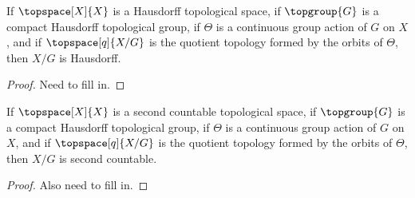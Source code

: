 \documentclass{article}                                                        %
\begin{document}
        \begin{theorem}
            \label{thm:Quotient_by_Compact_T2_Group_Preserves_T2}%
            If $\topspace[X]{X}$ is a Hausdorff topological space, if
            $\topgroup{G}$ is a compact Hausdorff topological group, if
            $\Theta$ is a continuous group action of $G$ on $X$, and if
            $\topspace[q]{X/G}$ is the quotient topology formed by the orbits
            of $\Theta$, then $X/G$ is Hausdorff.
        \end{theorem}
        \begin{proof}
            Need to fill in.
        \end{proof}
        \begin{theorem}
            \label{thm:Quotient_by_Compact_T2_Group_Preserves_Sec_Count}%
            If $\topspace[X]{X}$ is a second countable topological space, if
            $\topgroup{G}$ is a compact Hausdorff topological group, if
            $\Theta$ is a continuous group action of $G$ on $X$, and if
            $\topspace[q]{X/G}$ is the quotient topology formed by the orbits
            of $\Theta$, then $X/G$ is second countable.
        \end{theorem}
        \begin{proof}
            Also need to fill in.
        \end{proof}
\end{document}
